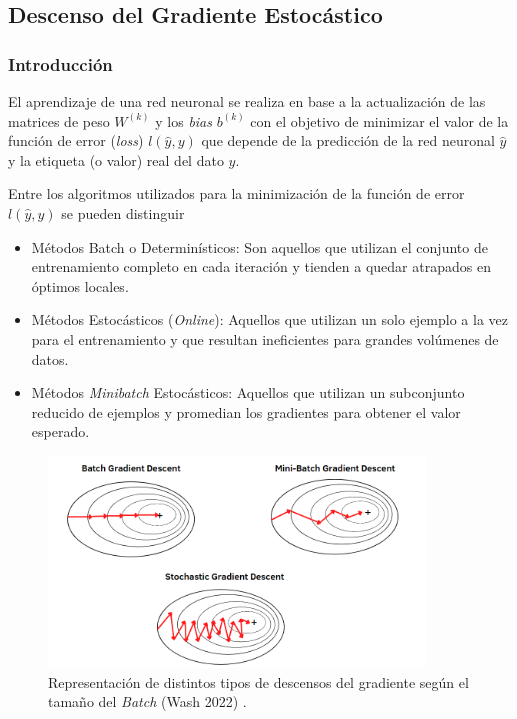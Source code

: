 \subsection{Descenso del Gradiente Estocástico} 

\subsubsection{Introducción }

El aprendizaje de una red neuronal se realiza en base a la actualización de las matrices de peso $W^{(k)}$ y los \textit{bias} $b^{(k)}$ con el objetivo de minimizar el valor de la función de error (\textit{loss}) $l(\hat{y},y)$ que depende de la predicción de la red neuronal $\hat{y}$ y la etiqueta (o valor) real del dato $y$. 

\vspace{0.2cm}

Entre los algoritmos utilizados para la minimización de la función de error $l(\hat{y},y)$ se pueden distinguir 
\begin{itemize}
    \item Métodos Batch o Determinísticos: Son aquellos que utilizan el conjunto de entrenamiento completo en cada iteración y tienden a quedar atrapados en óptimos locales. 
    
    \item Métodos Estocásticos (\textit{Online}): Aquellos que utilizan un solo ejemplo a la vez para el entrenamiento y que resultan ineficientes para grandes volúmenes de datos. 
    
    \item Métodos \textit{Minibatch} Estocásticos: Aquellos que utilizan un subconjunto reducido de ejemplos y promedian los gradientes para obtener el valor esperado.
    
\end{itemize}

\begin{figure}[h]
    \centering
    \includegraphics[width=10cm]{img/tesis/SGD.png}
    \caption{Representación de distintos tipos de descensos del gradiente según el tamaño del \textit{Batch} (Wash 2022) \cite{GradientDescent}.}
    \label{fig:SGD}
\end{figure}

